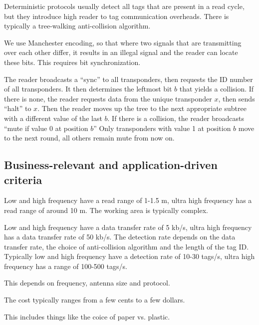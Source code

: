 \begin{mytitle} Deterministic protocols usually detect all tags that are present in a read cycle, but they introduce high reader to tag communication overheads. There is typically a tree-walking anti-collision algorithm.
    \begin{mysubtitle} We use Manchester encoding, so that where two signals that are transmitting over each other differ, it results in an illegal signal and the reader can locate these bits. This requires bit synchronization.
    
    \end{mysubtitle}
    \begin{mysubtitle}  The reader broadcasts a ``sync'' to all transponders, then requests the ID number of all transponders. It then determines the leftmost bit $b$ that yields a collision. If there is none, the reader requests data from the unique transponder $x$, then sends ``halt'' to $x$. Then the reader moves up the tree to the next appropriate subtree with a different value of the last $b$. If there is a collision, the reader broadcasts ``mute if value 0 at position $b$'' Only transponders with value 1 at position $b$ move to the next round, all others remain mute from now on.
    \end{mysubtitle}
\end{mytitle}

\subsection{Business-relevant and application-driven criteria}
\begin{mytitle}Low and high frequency have a read range of 1-1.5 m, ultra high frequency has a read range of around 10 m. The working area is typically complex.
\end{mytitle}
\begin{mytitle} Low and high frequency have a data transfer rate of 5 kb/s, ultra high frequency has a data transfer rate of 50 kb/s. The detection rate depends on the data transfer rate, the choice of anti-collision algorithm and the length of the tag ID. Typically low and high frequency have a detection rate of 10-30 tags/s, ultra high frequency has a range of 100-500 tags/s.
\end{mytitle}
\begin{mytitle}This depends on frequency, antenna size and protocol.
\end{mytitle}
\begin{mytitle}[Cost] The cost typically ranges from a few cents to a few dollars.
\end{mytitle}
\begin{mytitle}This includes things like the coice of paper vs. plastic.
\end{mytitle}

